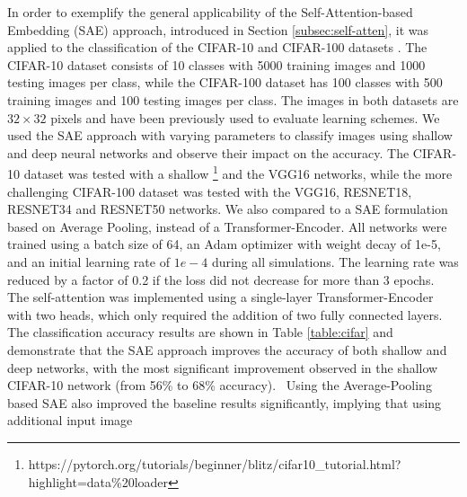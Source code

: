 \documentclass[10pt,journal]{IEEEtran}\usepackage{amsfonts}
\begin{document}
In order to exemplify the general applicability of the Self-Attention-based
Embedding (SAE) approach, introduced in Section \ref{subsec:self-atten}, it
was applied to the classification of the CIFAR-10 and CIFAR-100 datasets
\cite{CIFAR}. The CIFAR-10 dataset consists of 10 classes with 5000 training
images and 1000 testing images per class, while the CIFAR-100 dataset has 100
classes with 500 training images and 100 testing images per class. The images
in both datasets are $32\times32$ pixels and have been previously used to
evaluate learning schemes. We used the SAE approach with varying parameters to
classify images using shallow and deep neural networks and observe their
impact on the accuracy. The CIFAR-10 dataset was tested with a shallow
\footnote{https://pytorch.org/tutorials/beginner/blitz/cifar10\_tutorial.html?highlight=data\%20loader}
and the VGG16 networks, while the more challenging CIFAR-100 dataset was
tested with the VGG16, RESNET18, RESNET34 and RESNET50 networks. We also
compared to a SAE formulation based on Average Pooling, instead of a
Transformer-Encoder. All networks were trained using a batch size of 64, an
Adam optimizer with weight decay of 1e-5, and an initial learning rate of
$1e-4$ during all simulations. The learning rate was reduced by a factor of
0.2 if the loss did not decrease for more than 3 epochs. The self-attention
was implemented using a single-layer Transformer-Encoder with two heads, which
only required the addition of two fully connected layers. The classification
accuracy results are shown in Table \ref{table:cifar} and demonstrate that the
SAE approach improves the accuracy of both shallow and deep networks, with the
most significant improvement observed in the shallow CIFAR-10 network (from
56\% to 68\% accuracy). \ Using the Average-Pooling based SAE also improved
the baseline results significantly, implying that using additional input image
\end{document}
